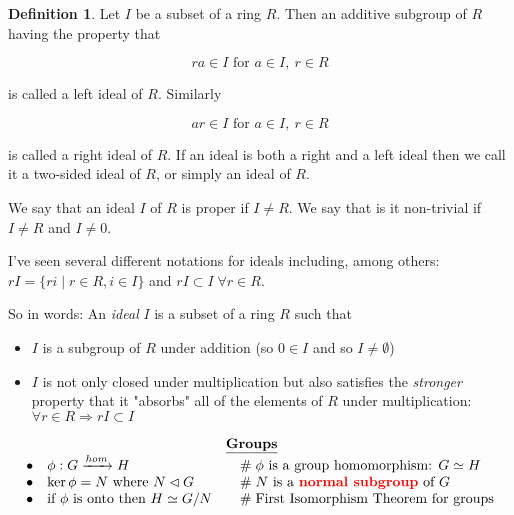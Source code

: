 \documentclass{article}
\theoremstyle{definition}
\newtheorem{definition}{Definition}[section]
\begin{document}
\begin{definition}
Let $I$ be a subset of a ring $R$. Then an additive subgroup of $R$ having the property that

\begin{equation*}
ra \in I \text{ for }  a \in I, \: r \in R
\end{equation*}

\bigskip
\noindent
is called a left ideal of $R$.  Similarly

\begin{equation*}
ar \in I \text{ for }  a \in I, \: r \in R
\end{equation*}

\bigskip
\noindent
is called a right ideal of $R$. If an ideal is both a right and a left ideal then we call it a two-sided ideal of $R$, or simply an ideal of $R$.
\end{definition}

\noindent
 We say that an ideal $I$ of $R$ is proper if $I \neq R$.  We say that is it non-trivial if $I \neq R$ and  $I \neq  0$.

\bigskip
\noindent
I've seen several different notations for ideals including, among others:  $rI = \{ri \mid r \in R, i \in I\}$ and 
$rI \subset I \;  \forall r \in R$. 

\bigskip
\noindent
So in words: An \emph{ideal} $I$ is a subset of a ring $R$ such that

\begin{itemize}
\item $I$ is a subgroup of $R$ under addition (so $0 \in I$ and so $I \neq \emptyset$) 
\item $I$  is not only closed under multiplication but also satisfies the \emph{stronger} property that it  
"absorbs" all of the elements of $R$ under multiplication: $\forall r \in R \Rightarrow rI \subset I$
\end{itemize}

\bigskip
\bigskip
\begin{mybox}
\begin{equation*}
\begin{array}{lllll}
&& \underline{\mathbf{Groups}} \\ 
\bullet&  \phi: G \xrightarrow{hom} H                            &\quad  \mathrel{\#} \text{$\phi$ is a group homomorphism: $G \simeq H$}   \\
\bullet&  \ker \phi = N$ where $N \lhd G                       &\quad  \mathrel{\#} \text{$N$ is a \textbf{{\color{red} normal subgroup}} of $G$}  \\
\bullet&  \text{if $\phi$ is onto then $H \simeq G/N$}   &\quad \mathrel{\#} \text{First Isomorphism Theorem for groups} \\
\end{array}
\end{equation*}
\end{mybox}
\end{document}
